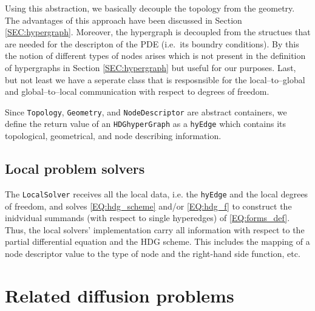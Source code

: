 \documentclass[a4paper, english, 12pt, reqno, draft]{amsart}
\theoremstyle{definition}
\theoremstyle{remark}
\numberwithin{equation}{section}
\newcommand{\code}[1]{\texttt{#1}}
\begin{document}
% 
Using this abstraction, we basically decouple the topology from the geometry. The advantages of this approach have been discussed in Section \ref{SEC:hypergraph}. Moreover, the hypergraph is decoupled from the structues that are needed for the descripton of the PDE (i.e.~its boundry conditions). By this the notion of different types of nodes arises which is not present in the definition of hypergraphs in Section \ref{SEC:hypergraph} but useful for our purposes. Last, but not least we have a seperate class that is resposnsible for the local--to--global and global--to--local communication with respect to degrees of freedom.

Since \code{Topology}, \code{Geometry}, and \code{NodeDescriptor} are abstract containers, we define the return value of an \code{HDGhyperGraph} as a \code{hyEdge} which contains its topological, geometrical, and node describing information.
% 
\subsection{Local problem solvers}
% 
The \code{LocalSolver} receives all the local data, i.e. the \code{hyEdge} and the local degrees of freedom, and solves \eqref{EQ:hdg_scheme} and/or \eqref{EQ:hdg_f} to construct the inidvidual summands (with respect to single hyperedges) of \eqref{EQ:forms_def}. Thus, the local solvers' implementation carry all information with respect to the partial differential equation and the HDG scheme. This includes the mapping of a node descriptor value to the type of node and the right-hand side function, etc.
% 
\section{Related diffusion problems}
% 
\end{document}
